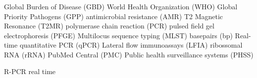 Global Burden of Disease (GBD)
World Health Organization (WHO)
Global Priority Pathogens (GPP)
antimicrobial resistance (AMR)
T2 Magnetic Resonance (T2MR)
polymerase chain reaction (PCR)
pulsed field gel electrophoresis (PFGE)
Multilocus sequence typing (MLST)
basepairs (bp)
Real-time quantitative PCR (qPCR)
Lateral flow immunoassays (LFIA)
ribossomal RNA (rRNA)
PubMed Central\textsuperscript{\small\textregistered} (PMC)
Public health surveillance systems (PHSS)


R-PCR real time 